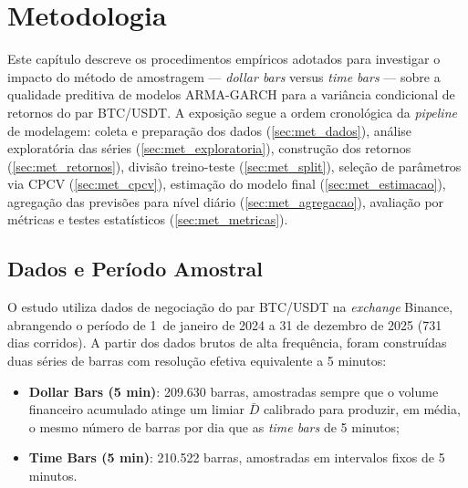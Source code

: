 \chapter{Metodologia}
\label{cap:metodologia}

Este capítulo descreve os procedimentos empíricos adotados para investigar o
impacto do método de amostragem --- \emph{dollar bars} versus \emph{time
bars} --- sobre a qualidade preditiva de modelos ARMA-GARCH para a variância
condicional de retornos do par BTC/USDT. A exposição segue a ordem
cronológica da \emph{pipeline} de modelagem: coleta e preparação dos dados
(\autoref{sec:met_dados}), análise exploratória das séries
(\autoref{sec:met_exploratoria}), construção dos retornos
(\autoref{sec:met_retornos}), divisão treino-teste
(\autoref{sec:met_split}), seleção de parâmetros via CPCV
(\autoref{sec:met_cpcv}), estimação do modelo final
(\autoref{sec:met_estimacao}), agregação das previsões para nível diário
(\autoref{sec:met_agregacao}), avaliação por métricas e testes estatísticos
(\autoref{sec:met_metricas}).

\section{Dados e Período Amostral}
\label{sec:met_dados}

O estudo utiliza dados de negociação do par BTC/USDT na \emph{exchange}
Binance, abrangendo o período de 1\textordmasculine\ de janeiro de 2024 a
31 de dezembro de 2025 (731 dias corridos). A partir dos dados brutos de
alta frequência, foram construídas duas séries de barras com resolução
efetiva equivalente a 5 minutos:

\begin{itemize}
    \item \textbf{Dollar Bars (5 min)}: 209.630 barras, amostradas sempre
          que o volume financeiro acumulado atinge um limiar
          $\bar{D}$ calibrado para produzir, em média, o mesmo número de
          barras por dia que as \emph{time bars} de 5 minutos;
    \item \textbf{Time Bars (5 min)}: 210.522 barras, amostradas em
          intervalos fixos de 5 minutos.
\end{itemize}

